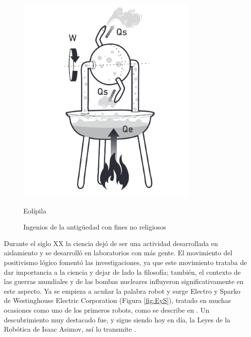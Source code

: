 \begin{figure}[ht!]
\begin{minipage}{0.3\linewidth}
		\includegraphics[width=\linewidth]{figs/eolipila.png}
		\caption*{\centering Eolípila} %
	\end{minipage}
	\caption{Ingenios de la antigüedad con fines no religiosos}
    \label{fig:ancient}
    \end{figure}

Durante el siglo XX la ciencia dejó de ser una actividad desarrollada en aislamiento y se desarrolló en laboratorios con más gente. El movimiento del positivismo lógico fomentó las investigaciones, ya que este movimiento trataba de dar importancia a la ciencia y dejar de lado la filosofía; también, el contexto de las guerras mundiales y de las bombas nucleares influyeron significativamente en este aspecto. Ya se empieza a acuñar la palabra robot y surge Electro y Sparko de Westinghouse Electric Corporation (Figura \ref{fig:EyS}), tratado en muchas ocasiones como uno de los primeros robots, como se describe en \cite{bidaudrobots}. Un descubrimiento muy destacado fue, y sigue siendo hoy en día, la Leyes de la Robótica de Isaac Asimov, así lo transmite \cite{barcelo2004nuevo}.



